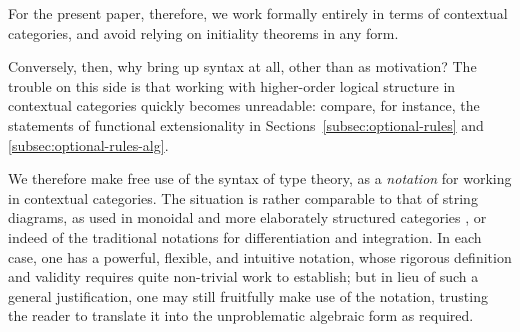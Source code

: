 For the present paper, therefore, we work formally entirely in terms of contextual categories, and avoid relying on initiality theorems in any form.

Conversely, then, why bring up syntax at all, other than as motivation?  The trouble on this side is that working with higher-order logical structure in contextual categories quickly becomes unreadable: compare, for instance, the statements of functional extensionality in Sections~\ref{subsec:optional-rules} and \ref{subsec:optional-rules-alg}.

We therefore make free use of the syntax of type theory, as a \emph{notation} for working in contextual categories.  The situation is rather comparable to that of string diagrams, as used in monoidal and more elaborately structured categories \cite{selinger:graphical-languages}, or indeed of the traditional notations for differentiation and integration.  In each case, one has a powerful, flexible, and intuitive notation, whose rigorous definition and validity requires quite non-trivial work to establish; but in lieu of such a general justification, one may still fruitfully make use of the notation, trusting the reader to translate it into the unproblematic algebraic form as required.

